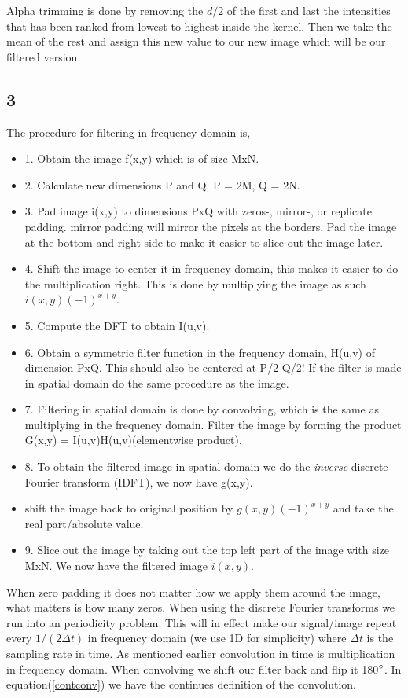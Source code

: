 {    Alpha trimming is done by removing the $d/2$ of the first and last the intensities that has been ranked from lowest to highest inside the kernel. Then we take the mean of the rest and assign this new value to our new image which will be our filtered version.

\subsection{3}

The procedure for filtering in frequency domain is,

\begin{itemize}
    \item 1. Obtain the image f(x,y) which is of size MxN.
    \item 2. Calculate new dimensions P and Q, P = 2M, Q = 2N.
    \item 3. Pad image i(x,y) to dimensions PxQ with zeros-, mirror-, or replicate padding. mirror padding will mirror the pixels at the borders. Pad the image at the bottom and right side to make it easier to slice out the image later.
    \item 4. Shift the image to center it in frequency domain, this makes it easier to do the multiplication right. This is done by multiplying the image as such $i(x,y)(-1)^{x+y}$.
    \item  5. Compute the DFT to obtain I(u,v).
    \item 6. Obtain a symmetric filter function in the frequency domain, H(u,v) of dimension PxQ. This should also be centered at P/2 Q/2! If the filter is made in spatial domain do the same procedure as the image.
    \item 7. Filtering in spatial domain is done by convolving, which is the same as multiplying in the frequency domain. Filter the image by forming the product G(x,y) = I(u,v)H(u,v)(elementwise product).
    \item 8. To obtain the filtered image in spatial domain we do the \emph{inverse} discrete Fourier transform (IDFT), we now have g(x,y).
    \item shift the image back to original position by $g(x,y)(-1)^{x+y}$ and take the real part/absolute value.
    \item 9. Slice out the image by taking out the top left part of the image with size MxN. We now have the filtered image $\hat{i}(x,y)$.
\end{itemize}

When zero padding it does not matter how we apply them around the image, what matters is how many zeros. When using the discrete Fourier transforms we run into an periodicity problem. This will in effect make our signal/image repeat every $1/(2\Delta t)$ in frequency domain (we use 1D for simplicity) where $\Delta t$ is the sampling rate in time. As mentioned earlier convolution in time is multiplication in frequency domain. When convolving we shift our filter back and flip it 180$\degree$. In equation(\ref{contconv}) we have the continues definition of the convolution.

}
